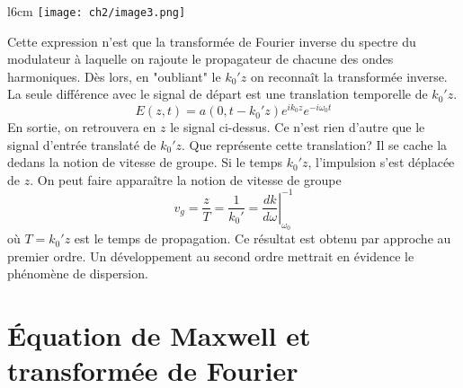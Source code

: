 \begin{wrapfigure}[7]{l}{6cm}
\vspace{-5mm}
\texttt{[image: ch2/image3.png]}
\end{wrapfigure}
Cette expression n'est que la transformée de Fourier inverse du spectre du modulateur à laquelle 
on rajoute le propagateur de chacune des ondes harmoniques. Dès lors, en "oubliant" le $k_0'z$ 
on reconnaît la transformée inverse. La seule différence avec le signal de départ est une 
translation temporelle de $k_0'z$.
\begin{equation}
E(z,t) = a(0,t-k_0'z)e^{ik_0z}e^{-i\omega_0t}
\end{equation}
En sortie, on retrouvera en $z$ le signal ci-dessus. Ce n'est rien d'autre que le signal d'entrée 
translaté de $k_0'z$. Que représente cette translation? Il se cache la dedans la notion de 
vitesse de groupe. Si le temps $k_0'z$, l'impulsion s'est déplacée de $z$. On peut faire 
apparaître la notion de vitesse de groupe
\begin{equation}
v_g = \dfrac{z}{T} = \dfrac{1}{k_0'} = \left.\dfrac{dk}{d\omega}\right|_{\omega_0}^{-1}
\end{equation}
où $T = k_0'z$ est le temps de propagation. Ce résultat est obtenu par approche au premier 
ordre. Un développement au second ordre mettrait en évidence le phénomène de dispersion.


\newpage
\section{Équation de Maxwell et transformée de Fourier}
































